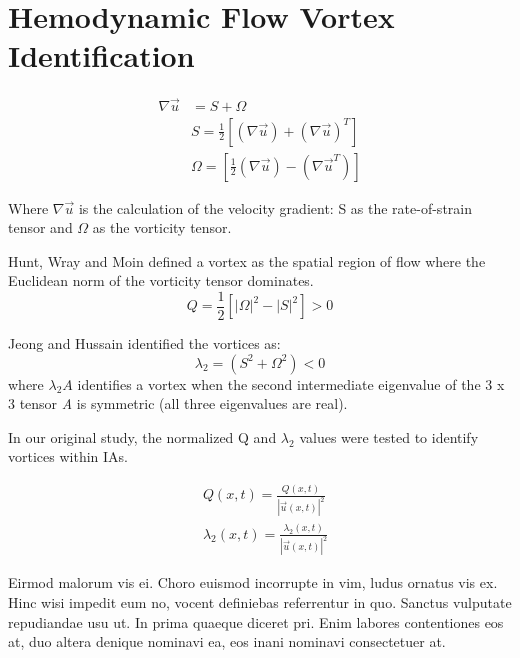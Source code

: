 \cleartooddpage[\thispagestyle{empty}]
\chapter{Hemodynamic Flow Vortex Identification}\label{CHAPTER2}



\begin{equation}
\begin{aligned}
\nabla \vec{u} & = S + \Omega \\
  			   & S = \frac{1}{2}\left[(\nabla \vec{u}) + (\nabla \vec{u})^T\right] \\
  			   & \Omega = \left[\frac{1}{2}(\nabla \vec{u}) - (\nabla \vec{u}^T)\right]
\end{aligned}
 \label{CHAPTER2_velocity_gradient_tensor}
\end{equation}

Where $\nabla\vec{u}$ is the calculation of the velocity gradient: S as the rate-of-strain tensor and $\Omega$ as the vorticity tensor.

Hunt, Wray and Moin \cite{hunt1988eddies} defined a vortex as the spatial region of flow where  the Euclidean norm of the vorticity tensor dominates.
\begin{equation}
Q = \frac{1}{2}\left[|\Omega|^2 - |S|^2\right] > 0
\label{CHAPTER2_Q}
\end{equation}

Jeong and Hussain identified the vortices as:
\begin{equation}
\lambda_2 = (S^2 + \Omega^2) < 0
\label{CHAPTER2_lambda2}
\end{equation}
where $\lambda_2{A}$ identifies a vortex when the second intermediate eigenvalue of the 3 x 3 tensor \textit{A} is symmetric (all three eigenvalues are real). 

In our original study, the normalized Q and $\lambda_2$ values were tested to identify vortices within IAs.

\begin{equation}
\begin{aligned}
&Q(x,t) = \frac{Q(x,t)}{|\vec{u}(x,t)|^2} \\
&\lambda_2 (x,t) = \frac{\lambda_2 (x,t)}{|\vec{u}(x,t)|^2}
\end{aligned}
\label{CHAPTER2_normalized_Q_lambda2}
\end{equation}



Eirmod malorum vis ei. Choro euismod incorrupte in vim, ludus ornatus vis ex. 
Hinc wisi impedit eum no, vocent definiebas referrentur in quo. Sanctus 
vulputate repudiandae usu ut. In prima quaeque diceret pri. Enim labores 
contentiones eos at, duo altera denique nominavi ea, eos inani nominavi 
consectetuer at.

